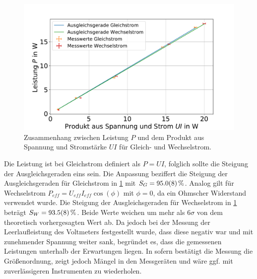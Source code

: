 \FloatBarrier




\begin{figure}[h]
	\centering
	\includegraphics[width=0.9\linewidth]{"auswertung/Auswertung Innenwiderstand/Leistung 2"}
	\caption{Zusammenhang zwischen Leistung $P$ und dem Produkt aus Spannung und Stromstärke $UI$ für Gleich- und Wechselstrom.}
	\label{fig:leistung-r2}
\end{figure}




Die Leistung ist bei Gleichstrom definiert als $P=UI$, folglich sollte die Steigung der Ausgleichsgeraden eins sein. Die Anpassung beziffert die Steigung der Ausgleichsgeraden für Gleichstrom in \cref{fig:leistung-r2} mit $S_{G}=\SI{ 95.0+-0.8}{\percent}$. Analog gilt für Wechselstrom $P_{eff}=U_{eff}  I_{eff} \cos(\phi)$ mit $\phi=0$, da ein Ohmscher Widerstand verwendet wurde. Die Steigung der Ausgleichsgeraden für Wechselstrom in \cref{fig:leistung-r2} beträgt $S_W=\SI{93.5+-0.8}{\percent}$. Beide Werte weichen um mehr als $6\sigma$ von dem theoretisch vorhergesagten Wert ab. Da jedoch bei der Messung der Leerlaufleistung des Voltmeters festgestellt wurde, dass diese negativ war und mit zunehmender Spannung weiter sank, begründet es, dass die gemessenen Leistungen unterhalb der Erwartungen liegen. In sofern bestätigt die Messung die Größenordnung, zeigt jedoch Mängel in den Messgeräten und wäre ggf. mit zuverlässigeren Instrumenten zu wiederholen.















